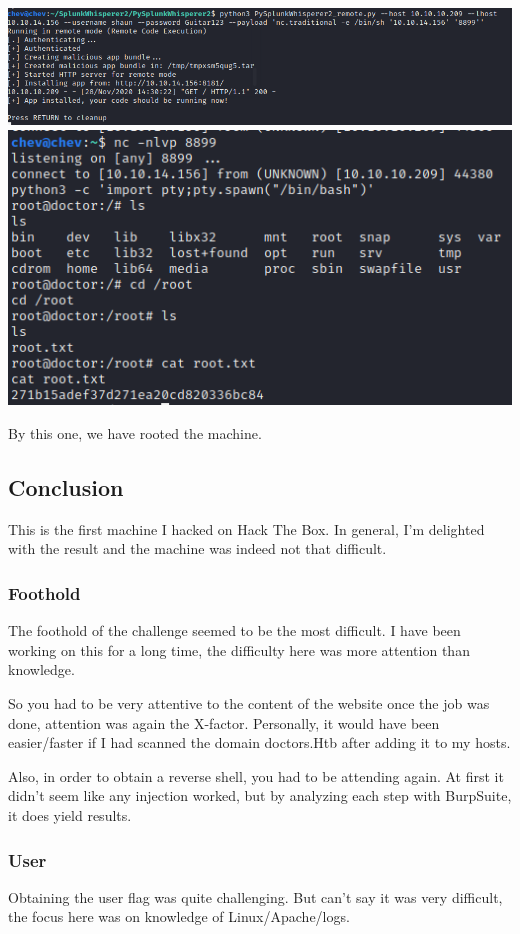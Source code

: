 \documentclass[../main.tex]{subfiles}
\begin{document}
\includegraphics[width=\linewidth]{images/Nicolai/doctor_py_splukd_payload.png}
\includegraphics[width=\linewidth]{images/Nicolai/doctor_root.png}

By this one, we have rooted the machine.

\subsection{Conclusion}

This is the first machine I hacked on Hack The Box. In general, I'm delighted with the result and the machine was indeed not that difficult.

\subsubsection{Foothold}
The foothold of the challenge seemed to be the most difficult. I have been working on this for a long time, the difficulty here was more attention than knowledge.

So you had to be very attentive to the content of the website once the job was done, attention was again the X-factor. Personally, it would have been easier/faster if I had scanned the domain doctors.Htb after adding it to my hosts.

Also, in order to obtain a reverse shell, you had to be attending again. At first it didn't seem like any injection worked, but by analyzing each step with BurpSuite, it does yield results.
\clearpage
\subsubsection{User}
Obtaining the user flag was quite challenging. But can't say it was very difficult, the focus here was on knowledge of Linux/Apache/logs. 
\end{document}

